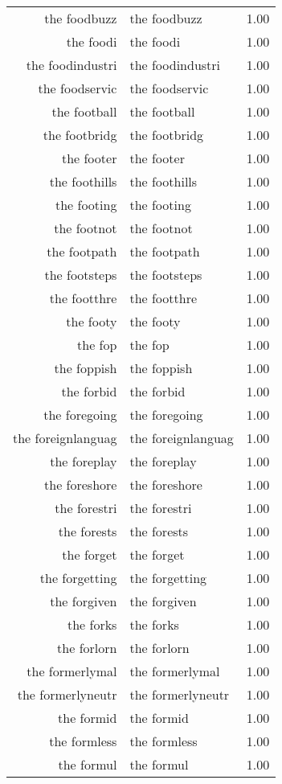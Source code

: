 \begin{table}[ht]
\begin{tabular}{rlr}
  the foodbuzz & the foodbuzz & 1.00 \\ 
  the foodi & the foodi & 1.00 \\ 
  the foodindustri & the foodindustri & 1.00 \\ 
  the foodservic & the foodservic & 1.00 \\ 
  the football & the football & 1.00 \\ 
  the footbridg & the footbridg & 1.00 \\ 
  the footer & the footer & 1.00 \\ 
  the foothills & the foothills & 1.00 \\ 
  the footing & the footing & 1.00 \\ 
  the footnot & the footnot & 1.00 \\ 
  the footpath & the footpath & 1.00 \\ 
  the footsteps & the footsteps & 1.00 \\ 
  the footthre & the footthre & 1.00 \\ 
  the footy & the footy & 1.00 \\ 
  the fop & the fop & 1.00 \\ 
  the foppish & the foppish & 1.00 \\ 
  the forbid & the forbid & 1.00 \\ 
  the foregoing & the foregoing & 1.00 \\ 
  the foreignlanguag & the foreignlanguag & 1.00 \\ 
  the foreplay & the foreplay & 1.00 \\ 
  the foreshore & the foreshore & 1.00 \\ 
  the forestri & the forestri & 1.00 \\ 
  the forests & the forests & 1.00 \\ 
  the forget & the forget & 1.00 \\ 
  the forgetting & the forgetting & 1.00 \\ 
  the forgiven & the forgiven & 1.00 \\ 
  the forks & the forks & 1.00 \\ 
  the forlorn & the forlorn & 1.00 \\ 
  the formerlymal & the formerlymal & 1.00 \\ 
  the formerlyneutr & the formerlyneutr & 1.00 \\ 
  the formid & the formid & 1.00 \\ 
  the formless & the formless & 1.00 \\ 
  the formul & the formul & 1.00 \\ 

\end{tabular}
\end{table}
